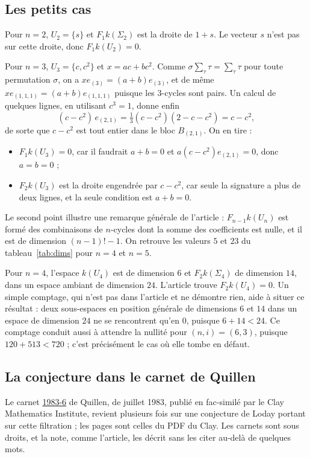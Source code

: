 \documentclass[11pt,a4paper]{amsart}
\theoremstyle{definition}
\theoremstyle{plain}
\theoremstyle{remark}
\begin{document}
\subsection{Les petits cas}

Pour $n = 2$, $U_2 = \{s\}$ et $F_1 k(\Sigma_2)$ est la droite de $1 + s$. Le vecteur $s$ n'est pas sur cette droite, donc $F_1 k(U_2) = 0$.

Pour $n = 3$, $U_3 = \{c, c^2\}$ et $x = a c + b c^2$. Comme $\sigma \sum_\tau \tau = \sum_\tau \tau$ pour toute permutation $\sigma$, on a $x e_{(3)} = (a+b) e_{(3)}$, et de même $x e_{(1,1,1)} = (a+b) e_{(1,1,1)}$ puisque les $3$-cycles sont pairs. Un calcul de quelques lignes, en utilisant $c^3 = 1$, donne enfin
\[
(c - c^2)\, e_{(2,1)} = \tfrac13 (c - c^2)(2 - c - c^2) = c - c^2,
\]
de sorte que $c - c^2$ est tout entier dans le bloc $B_{(2,1)}$. On en tire :
\begin{itemize}
\item $F_1 k(U_3) = 0$, car il faudrait $a + b = 0$ et $a(c - c^2) e_{(2,1)} = 0$, donc $a = b = 0$ ;
\item $F_2 k(U_3)$ est la droite engendrée par $c - c^2$, car seule la signature a plus de deux lignes, et la seule condition est $a + b = 0$.
\end{itemize}
Le second point illustre une remarque générale de l'article : $F_{n-1} k(U_n)$ est formé des combinaisons de $n$-cycles dont la somme des coefficients est nulle, et il est de dimension $(n-1)! - 1$. On retrouve les valeurs $5$ et $23$ du tableau~\ref{tab:dims} pour $n = 4$ et $n = 5$.

Pour $n = 4$, l'espace $k(U_4)$ est de dimension $6$ et $F_2 k(\Sigma_4)$ de dimension $14$, dans un espace ambiant de dimension $24$. L'article trouve $F_2 k(U_4) = 0$. Un simple comptage, qui n'est pas dans l'article et ne démontre rien, aide à situer ce résultat : deux sous-espaces \og en position générale\fg{} de dimensions $6$ et $14$ dans un espace de dimension $24$ ne se rencontrent qu'en $0$, puisque $6 + 14 < 24$. Ce comptage conduit aussi à attendre la nullité pour $(n, i) = (6, 3)$, puisque $120 + 513 < 720$ ; c'est précisément le cas où elle tombe en défaut.

\subsection{La conjecture dans le carnet de Quillen}

Le carnet \href{https://www.claymath.org/library/Quillen/Working_papers/quillen\%201983/1983-6.pdf}{1983-6} de Quillen, de juillet 1983, publié en fac-similé par le Clay Mathematics Institute, revient plusieurs fois sur une conjecture de Loday portant sur cette filtration ; les pages sont celles du PDF du Clay. Les carnets sont sous droits, et la note, comme l'article, les décrit sans les citer au-delà de quelques mots.
\end{document}
